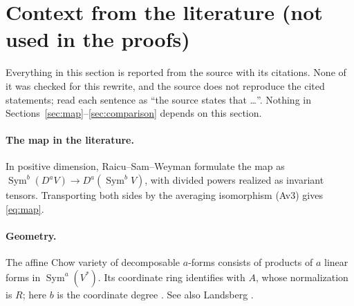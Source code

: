 \documentclass[11pt]{article}
\theoremstyle{remark}
\DeclareMathOperator{\Sym}{Sym}
\begin{document}
\section{Context from the literature (not used in the proofs)}
\label{sec:context}

Everything in this section is reported from the source with its citations.
None of it was checked for this rewrite, and the source does not reproduce
the cited statements; read each sentence as ``the source states that
\dots''. Nothing in Sections~\ref{sec:map}--\ref{sec:comparison} depends on
this section.

\paragraph{The map in the literature.}
In positive dimension, Raicu--Sam--Weyman \cite[Section~2]{RSW} formulate
the map as $\Sym^b(D^aV)\longrightarrow D^a(\Sym^bV)$, with divided powers
realized as invariant tensors. Transporting both sides by the averaging
isomorphism (Av3) gives \eqref{eq:map}.

\paragraph{Geometry.}
The affine Chow variety of decomposable $a$-forms consists of products of
$a$ linear forms in $\Sym^a(V^*)$. Its coordinate ring identifies with $A$,
whose normalization is $R$; here $b$ is the coordinate degree
\cite[Section~2, Theorem~2.3]{RSW}. See also Landsberg
\cite[Section~7.6, Propositions~7.11--7.12]{Landsberg}.
\end{document}
